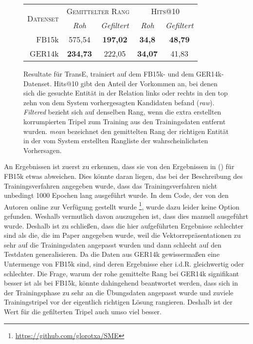 \begin{figure}[h]
  \centering
  \begin{tabular}{r||cc|cc}
    \multirow{2}{*}{\textsc{Datenset}} & \multicolumn{2}{c|}{\textsc{Gemittelter Rang}} & \multicolumn{2}{c}{\textsc{Hits@10}} \\
     & \emph{Roh} & \emph{Gefiltert} & \emph{Roh} & \emph{Gefiltert} \\
     \hline
     FB15k & 575,54 & \textbf{197,02} & \textbf{34,8} & \textbf{48,79} \\
     GER14k & \textbf{234,73} & 222,05 & \textbf{34,07} & 41,83 \\

  \end{tabular}
  \caption[Resultate für TransE mit FB15k und GER14k]{Resultate für TransE, trainiert auf dem FB15k- und dem GER14k-Datenset.
  Hits@10 gibt den Anteil der Vorkommen an, bei denen sich die gesuchte Entität in der Relation links oder rechts in den top zehn
  von dem System vorhergesagten Kandidaten befand (\emph{raw}). \emph{Filtered} bezieht sich auf denselben Rang, wenn die extra erstellten
  korrumpierten Tripel zum Training aus den Trainingsdaten entfernt wurden. \emph{mean} bezeichnet den gemittelten Rang der richtigen
  Entität in der vom System erstellten Rangliste der wahrscheinlichsten Vorhersagen.\label{fig:results1}}
\end{figure}

An Ergebnissen ist zuerst zu erkennen, dass sie von den Ergebnissen in (\cite{bordes2013translating}) für FB15k etwas abweichen.
Dies könnte daran liegen, das bei der Beschreibung des Trainingsverfahren angegeben wurde, dass das Trainingsverfahren
nicht unbedingt 1000 Epochen lang ausgeführt wurde. In dem Code, der von den Autoren online zur Verfügung gestellt wurde
\footnote{\url{https://github.com/glorotxa/SME}}, wurde dazu leider keine Option gefunden. Weshalb vermutlich davon auszugehen
ist, dass dies manuell ausgeführt wurde. Deshalb ist zu schließen, dass die hier aufgeführten Ergebnisse schlechter sind als die,
die im Paper angegeben wurde, weil die Vektorrepräsentationen zu sehr auf die Trainingsdaten angepasst wurden und dann schlecht
auf den Testdaten generalisieren. Da die Daten aus GER14k gewissermaßen eine Untermenge von FB15k sind, sind deren Ergebnisse
eher i.d.R. gleichwertig oder schlechter. Die Frage, warum der rohe gemittelte Rang bei GER14k signifikant besser ist als
bei FB15k, könnte dahingehend beantwortet werden, dass sich in der Trainingsphase zu sehr an die Übungsdaten angepasst wurde und
zuviele Trainingstripel vor der eigentlich richtigen Lösung rangieren. Deshalb ist der Wert für die gefilterten Tripel auch umso viel
besser.


